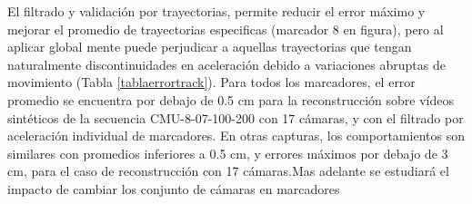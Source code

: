 El filtrado y validación por trayectorias, permite reducir el error máximo y mejorar el promedio de trayectorias especificas (marcador 8 en figura), pero al aplicar global mente puede perjudicar a aquellas trayectorias que tengan naturalmente discontinuidades en aceleración debido a variaciones abruptas de movimiento (Tabla \ref{tablaerrortrack}). Para todos los marcadores, el error promedio se encuentra por debajo de 0.5 cm para la reconstrucción sobre vídeos sintéticos de la secuencia CMU-8-07-100-200 con 17 cámaras, y con el filtrado por aceleración individual de marcadores. En otras capturas, los comportamientos son similares con promedios inferiores a 0.5 cm, y errores máximos por debajo de 3 cm, para el caso de reconstrucción con 17 cámaras.Mas adelante se estudiará el impacto de cambiar los conjunto de cámaras en marcadores   

